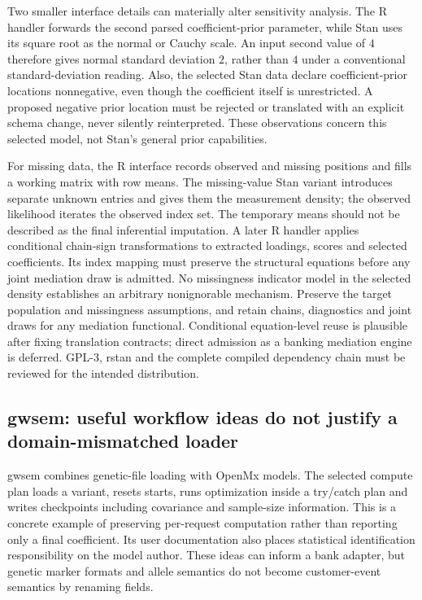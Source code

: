Two smaller interface details can materially alter sensitivity analysis. The R
handler forwards the second parsed coefficient-prior parameter, while Stan uses
its square root as the normal or Cauchy scale. An input second value of $4$
therefore gives normal standard deviation $2$, rather than $4$ under a
conventional standard-deviation reading. Also, the selected Stan data declare
coefficient-prior locations nonnegative, even though the coefficient itself is
unrestricted. A proposed negative prior location must be rejected or translated
with an explicit schema change, never silently reinterpreted. These observations
concern this selected model, not Stan's general prior capabilities.\citep{exec25_cmed_bsem}

For missing data, the R interface records observed and missing positions and
fills a working matrix with row means. The missing-value Stan variant introduces
separate unknown entries and gives them the measurement density; the observed
likelihood iterates the observed index set. The temporary means should not be
described as the final inferential imputation. A later R handler applies conditional chain-sign transformations to extracted
loadings, scores and selected coefficients. Its index mapping must preserve the
structural equations before any joint mediation draw is admitted. No missingness
indicator model in the selected density establishes an arbitrary nonignorable
mechanism. Preserve
the target population and missingness assumptions, and retain chains,
diagnostics and joint draws for any mediation functional. Conditional
equation-level reuse is plausible after fixing translation contracts; direct
admission as a banking mediation engine is deferred. GPL-3, rstan and the
complete compiled dependency chain must be reviewed for the intended
distribution.\citep{exec25_cmed_bsem,exec25_cmed_choice}

\subsection{gwsem: useful workflow ideas do not justify a domain-mismatched loader}

gwsem combines genetic-file loading with OpenMx models. The selected compute plan
loads a variant, resets starts, runs optimization inside a try/catch plan and
writes checkpoints including covariance and sample-size information. This is a
concrete example of preserving per-request computation rather than reporting
only a final coefficient. Its user documentation also places statistical
identification responsibility on the model author. These ideas can inform a
bank adapter, but genetic marker formats and allele semantics do not become
customer-event semantics by renaming fields.\citep{exec25_cmed_gwsem}


